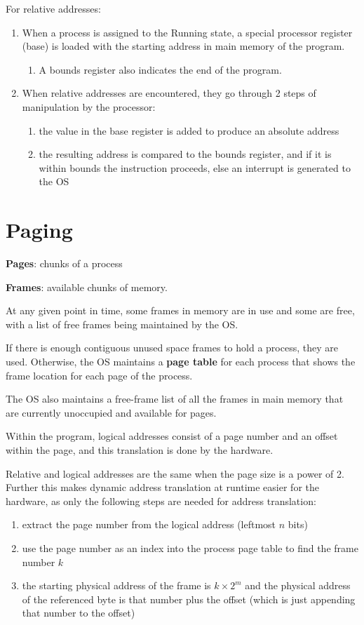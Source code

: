 \documentclass[11pt]{article}
\begin{document}
For relative addresses:
\begin{enumerate}
\item When a process is assigned to the Running state, a special processor register (base)
is loaded with the starting address in main memory of the program.
\begin{enumerate}
\item A bounds register also indicates the end of the program.
\end{enumerate}
\item When relative addresses are encountered, they go through 2 steps of manipulation by
the processor:
\begin{enumerate}
\item the value in the base register is added to produce an absolute address
\item the resulting address is compared to the bounds register, and if it is within
bounds the instruction proceeds, else an interrupt is generated to the OS
\end{enumerate}
\end{enumerate}
\section{Paging}
\label{sec:org0f1d209}
\textbf{Pages}: chunks of a process

\textbf{Frames}: available chunks of memory.

At any given point in time, some frames in memory are in use and some are free, with a
list of free frames being maintained by the OS.

If there is enough contiguous unused space frames to hold a process, they are used.
Otherwise, the OS maintains a \textbf{page table} for each process that shows the frame location
for each page of the process.

The OS also maintains a free-frame list of all the frames in main memory that are
currently unoccupied and available for pages.

Within the program, logical addresses consist of a page number and an offset within the
page, and this translation is done by the hardware.

Relative and logical addresses are the same when the page size is a power of 2.
Further this makes dynamic address translation at runtime easier for the hardware, as
only the following steps are needed for address translation:
\begin{enumerate}
\item extract the page number from the logical address (leftmost \(n\) bits)
\item use the page number as an index into the process page table to find the frame number
\(k\)
\item the starting physical address of the frame is \(k \times 2^{m}\) and the physical
address of the referenced byte is that number plus the offset (which is just appending
that number to the offset)
\end{enumerate}
\end{document}
